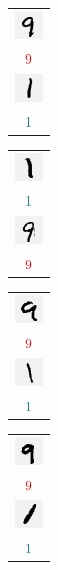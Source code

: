 \documentclass[11pt, justified]{tufte-book}
\theoremstyle{definition}
\begin{document}
        \begin{figure}
            \centering
          \begin{tabular}{c}\includegraphics[width=0.75cm]{example-mnist/mnist-trn-00}\\$\red{9}$\\\includegraphics[width=0.75cm]{example-mnist/mnist-trn-10}\\$\cya{1}$\end{tabular}%
          \begin{tabular}{c}\includegraphics[width=0.75cm]{example-mnist/mnist-trn-01}\\$\cya{1}$\\\includegraphics[width=0.75cm]{example-mnist/mnist-trn-11}\\$\red{9}$\end{tabular}%
          \begin{tabular}{c}\includegraphics[width=0.75cm]{example-mnist/mnist-trn-02}\\$\red{9}$\\\includegraphics[width=0.75cm]{example-mnist/mnist-trn-12}\\$\cya{1}$\end{tabular}%
          \begin{tabular}{c}\includegraphics[width=0.75cm]{example-mnist/mnist-trn-03}\\$\red{9}$\\\includegraphics[width=0.75cm]{example-mnist/mnist-trn-13}\\$\cya{1}$\end{tabular}%

\end{figure}
\end{document}
